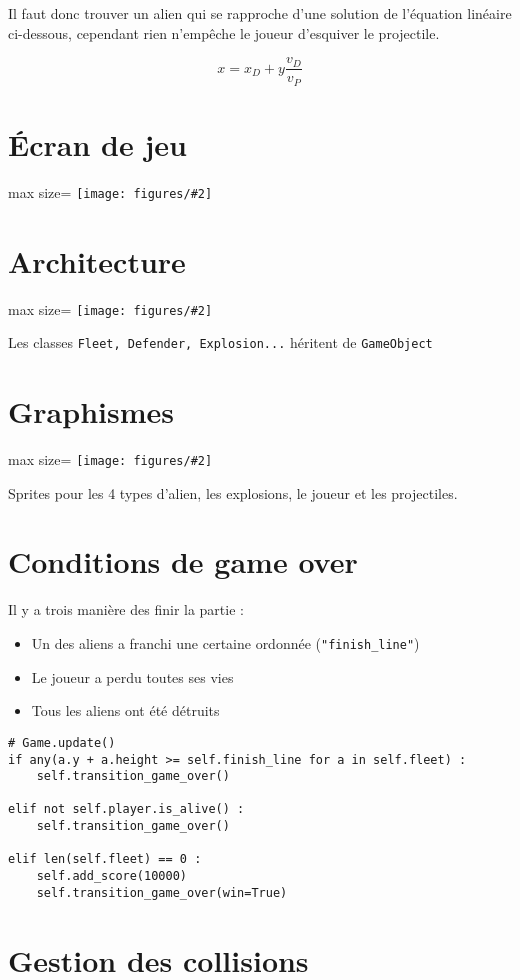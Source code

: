 \documentclass[12pt]{article}
\newcommand{\pagesection}{\newpage\section}
\newcommand{\pic}[2][]{
\begin{center}
\begin{adjustbox}{max size={\textwidth}{\textheight}}
	\texttt{[image: figures/\#2]}
\end{adjustbox}
\end{center}
}
\begin{document}
	\par Il faut donc trouver un alien qui se rapproche d'une solution de l'équation linéaire ci-dessous, 
	cependant rien n'empêche le joueur d'esquiver le projectile.

		$$\boxed{x = x_D + y \frac{v_D}{v_P}}$$







\section{Écran de jeu}
\pic{screen}


\pagesection{Architecture}
\pic{uml}
\begin{center}
Les classes \texttt{Fleet, Defender, Explosion...} héritent de \texttt{GameObject}
\end{center}



\pagesection{Graphismes}
\pic{gfx.png}
\begin{center}
Sprites pour les 4 types d'alien, les explosions, le joueur et les projectiles.
\end{center}


\vfill

\section{Conditions de game over}
	
	Il y a trois manière des finir la partie :
	\begin{itemize}
		\item Un des aliens a franchi une certaine ordonnée (\texttt{"finish\_line"})
		\item Le joueur a perdu toutes ses vies
		\item Tous les aliens ont été détruits
	\end{itemize}
	
\begin{verbatim}
# Game.update()
if any(a.y + a.height >= self.finish_line for a in self.fleet) :
	self.transition_game_over()

elif not self.player.is_alive() :
	self.transition_game_over()

elif len(self.fleet) == 0 :
	self.add_score(10000)
	self.transition_game_over(win=True)
\end{verbatim}



\pagesection{Gestion des collisions}
\end{document}
